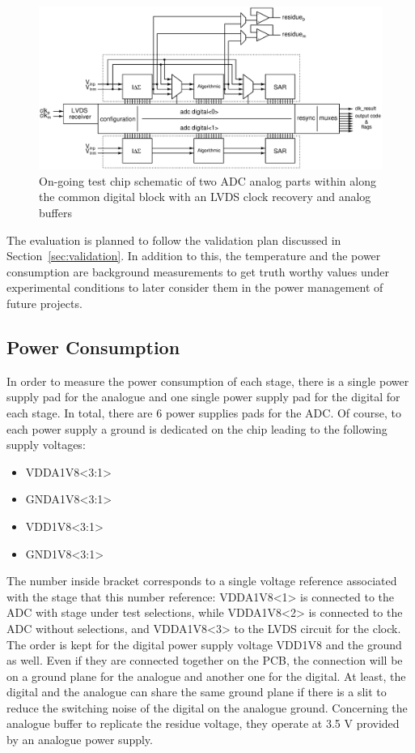 \begin{figure}[htp]
    \centering
    \includegraphics[width=\textwidth]{Chapter5/Figs/adc_chip/top_adc_chip.ps}%
    \caption{On-going test chip schematic of two ADC analog parts within along the common digital block with an LVDS clock recovery and analog buffers}
    \label{fig:top-chip}
\end{figure}

The evaluation is planned to follow the validation plan discussed in Section~\ref{sec:validation}. In addition to this, the temperature and the power consumption are background measurements to get truth worthy values under experimental conditions to later consider them in the power management of future projects.

\subsection{Power Consumption}
In order to measure the power consumption of each stage, there is a single power supply pad for the analogue and one single power supply pad for the digital for each stage. In total, there are 6 power supplies pads for the ADC\@. Of course, to each power supply a ground is dedicated on the chip leading to the following supply voltages:
\begin{itemize}
    \item VDDA1V8<3:1>
    \item GNDA1V8<3:1>
    \item VDD1V8<3:1>
    \item GND1V8<3:1>
\end{itemize}
The number inside bracket corresponds to a single voltage reference associated with the stage that this number reference: VDDA1V8<1> is connected to the ADC with stage under test selections, while VDDA1V8<2> is connected to the ADC without selections, and VDDA1V8<3> to the LVDS circuit for the clock. The order is kept for the digital power supply voltage VDD1V8 and the ground as well.
Even if they are connected together on the PCB, the connection will be on a ground plane for the analogue and another one for the digital. At least, the digital and the analogue can share the same ground plane if there is a slit to reduce the switching noise of the digital on the analogue ground.
Concerning the analogue buffer to replicate the residue voltage, they operate at 3.5 V provided by an analogue power supply.

